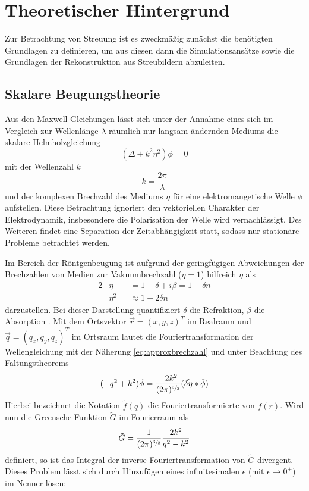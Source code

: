 \chapter{Theoretischer Hintergrund}
\label{c_theorie}
 Zur Betrachtung von Streuung ist es zweckmäßig zunächst die benötigten Grundlagen zu definieren, um aus diesen dann die Simulationsansätze sowie die Grundlagen der Rekonstruktion aus Streubildern abzuleiten.
\section{Skalare Beugungstheorie}
Aus den Maxwell-Gleichungen lässt sich unter der Annahme eines sich im Vergleich zur Wellenlänge $\lambda$ räumlich nur langsam ändernden Mediums die skalare Helmholzgleichung
\begin{equation}
\label{eq:wellengleichung_r}
(\Delta+k^2\eta^2)\phi=0
\end{equation}
mit der Wellenzahl $k$
\begin{equation}
	k=\frac{2\pi}{\lambda}
\end{equation} und der komplexen Brechzahl des Mediums $\eta$ für eine elektromangetische Welle $\phi$ aufstellen. Diese Betrachtung ignoriert den vektoriellen Charakter der Elektrodynamik, insbesondere die Polarisation der Welle wird vernachlässigt. Des Weiteren findet eine Separation der Zeitabhängigkeit statt, sodass nur stationäre Probleme betrachtet werden.

Im Bereich der Röntgenbeugung ist aufgrund der geringfügigen Abweichungen der Brechzahlen von Medien zur Vakuumbrechzahl ($\eta=1$) hilfreich $\eta$ als
\begin{alignat}{2}
\label{eq:brechzahl}
	&\eta&&=1-\delta+i\beta=1 + \delta n \\
\label{eq:approxbrechzahl}
	&\eta^2&&\approx 1 + 2\delta n
\end{alignat}
darzustellen. Bei dieser Darstellung quantifiziert $\delta$ die Refraktion, $\beta$ die Absorption \cite{attwood1999}.
Mit dem Ortsvektor $\vec{r}=(x,y,z)^T$ im Realraum und $\vec{q}=(q_x,q_y,q_z)^T$ im Ortsraum lautet die Fouriertransformation der Wellengleichung mit der Näherung \ref{eq:approxbrechzahl} und unter Beachtung des Faltungstheorems
\begin{equation}
\label{eq:wellengleichung_f}
	(-q^2+k^2)\tilde{\phi}=\frac{-2k^2}{(2\pi)^{\sfrac{3}{2}}}(\tilde{\delta \eta} \ast \tilde{\phi})
\end{equation}
Hierbei bezeichnet die Notation $\tilde{f}(q)$ die Fouriertransformierte von $f(r)$. Wird nun die Greensche Funktion  $\tilde{G}$ im Fourierraum als
\begin{equation}
	\tilde{G}=\frac{1}{(2\pi)^{\sfrac{3}{2}}}\frac{2k^2}{q^2-k^2}
\end{equation}
definiert, so ist das Integral der inverse Fouriertransformation von $\tilde{G}$ divergent. Dieses Problem lässt sich durch Hinzufügen eines infinitesimalen  $\epsilon$ (mit $\epsilon\rightarrow 0^+$) im Nenner lösen:

